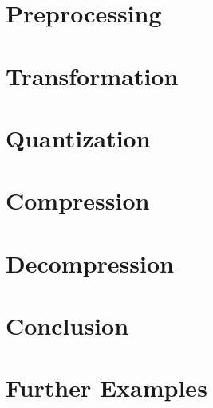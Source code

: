 \documentclass[11pt]{article}         %
\begin{document}
\section{Preprocessing}
\label{sec: preprocessing}

\section{Transformation}
\label{sec: transofrmation}

\section{Quantization}
\label{sec: quantization}

\section{Compression}
\label{sec: compression}

\section{Decompression}
\label{sec: decompression}

\section{Conclusion}
\label{sec: conclusion}

\section{Further Examples}
\label{sec: furtherexamples}


%
\end{document}
